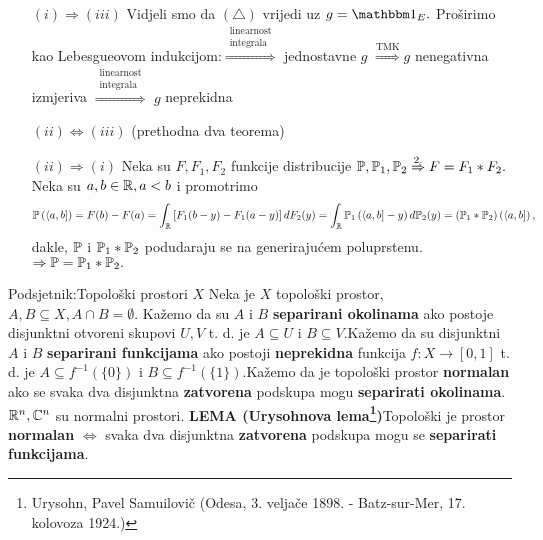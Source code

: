 \documentclass{article}
\begin{document}
\begin{itemize}
    \item[\(\boxed{(i)\Rightarrow (iii)}\)] Vidjeli smo da \((\triangle)\) vrijedi uz \(g=\mathbbm 1_E.\) Proširimo kao Lebesgueovom indukcijom:\newline \(\overset{\substack{\text{linearnost}\\\text{integrala}}}{\Rightarrow}\) jednostavne \(g\) \(\overset{\text{TMK}}{\Rightarrow}\)\(g\) nenegativna izmjeriva \(\overset{\substack{\text{linearnost}\\\text{integrala}}}{\Rightarrow}\) \(g\) neprekidna
    \item[\(\boxed{(ii)\Leftrightarrow (iii)}\)] (prethodna dva teorema)
    \item[\(\boxed{(ii)\Rightarrow (i)}\)] Neka su \(F,F_1,F_2\) funkcije distribucije \(\Bbb P,\Bbb P_1,\Bbb P_2\overset{2.}{\Rightarrow} F=F_1*F_2.\) Neka su \(a,b\in\Bbb R,a<b\) i promotrimo \[\Bbb P\left(\langle a,b]\right)=F(b)-F(a)=\int_{\Bbb R}\left[F_1(b-y)-F_1(a-y)\right]dF_2(y)=\int_{\Bbb R}\Bbb P_1\left(\langle a,b]-y\right)d\Bbb P_2(y)=\left(\Bbb P_1*\Bbb P_2\right)\left(\langle a,b]\right),\] dakle, \(\Bbb P\) i \(\Bbb P_1*\Bbb P_2\) podudaraju se na generirajućem poluprstenu. \(\Rightarrow\Bbb P=\Bbb P_1*\Bbb P_2.\) 
\end{itemize}
Podsjetnik:\newline Topološki prostori \(X\)\newline\newline
Neka je \(X\) topološki prostor, \(A,B\subseteq X,A\cap B=\emptyset.\) Kažemo da su \(A\) i \(B\) \textbf{separirani okolinama} ako postoje disjunktni otvoreni skupovi \(U,V\) t. d. je \(A\subseteq U\) i \(B\subseteq V.\)\newline Kažemo da su disjunktni \(A\) i \(B\) \textbf{separirani funkcijama} ako postoji \textbf{neprekidna} funkcija \(f:X\to [0,1]\) t. d. je \(A\subseteq f^{-1}\left(\{0\}\right)\) i \(B\subseteq f^{-1}\left(\{1\}\right).\)\newline Kažemo da je topološki prostor \textbf{normalan} ako se svaka dva disjunktna \textbf{zatvorena} podskupa mogu \textbf{separirati okolinama}.\newline \(\Bbb R^n,\Bbb C^n\) su normalni prostori.\newline\newline
\textbf{LEMA (Urysohnova lema\footnote[25]{Urysohn, Pavel Samuilovič (Odesa, 3. veljače 1898. - Batz-sur-Mer, 17. kolovoza 1924.)})}\newline Topološki je prostor \textbf{normalan} \(\Leftrightarrow\) svaka dva disjunktna \textbf{zatvorena} podskupa mogu se \textbf{separirati funkcijama}.\newpage
\end{document}
